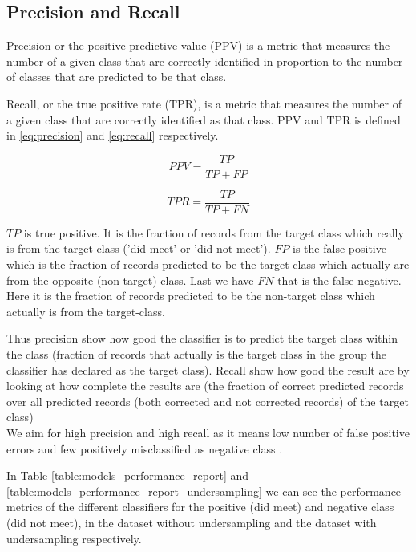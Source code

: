\subsection{Precision and Recall}
Precision or the positive predictive value (PPV) is a metric that measures the number of a given class that are correctly identified in proportion to the number of classes that are predicted to be that class.

Recall, or the true positive rate (TPR), is a metric that measures the number of a given class that are correctly identified as that class. PPV and TPR is defined in \autoref{eq:precision} and \autoref{eq:recall} respectively. 

\begin{equation}
\label{eq:precision}
PPV=\frac{TP}{TP+FP}
\end{equation}

\begin{equation}
\label{eq:recall}
TPR=\frac{TP}{TP+FN}
\end{equation}

$TP$ is true positive. It is the fraction of records from the target class which really is from the target class ('did meet' or 'did not meet'). $FP$ is the false positive which is the fraction of records predicted to be the target class which actually are from the opposite (non-target) class. Last we have $FN$ that is the false negative. Here it is the fraction of records predicted to be the non-target class which actually is from the target-class. 

Thus precision show how good the classifier is to predict the target class within the class (fraction of records that actually is the target class in the group the classifier has declared as the target class). Recall show how good the result are by looking at how complete the results are (the fraction of correct predicted records over all predicted records (both corrected and not corrected records) of the target class)\\

We aim for high precision and high recall as it means low number of false positive errors and few positively misclassified as negative class \cite{tan2006introduction}. 

In Table \ref{table:models_performance_report} and \ref{table:models_performance_report_undersampling} we can see the performance metrics of the different classifiers for the positive (did meet) and negative class (did not meet), in the dataset without undersampling and the dataset with undersampling respectively.

